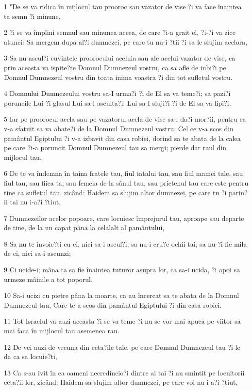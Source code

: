 \par 1 "De se va ridica în mijlocul tau prooroc sau vazator de vise ?i va face înaintea ta semn ?i minune,
\par 2 ?i se va împlini semnul sau minunea aceea, de care ?i-a grait el, ?i-?i va zice atunci: Sa mergem dupa al?i dumnezei, pe care tu nu-i ?tii ?i sa le slujim acelora,
\par 3 Sa nu ascul?i cuvintele proorocului aceluia sau ale acelui vazator de vise, ca prin aceasta va ispite?te Domnul Dumnezeul vostru, ca sa afle de iubi?i pe Domnul Dumnezeul vostru din toata inima voastra ?i din tot sufletul vostru.
\par 4 Domnului Dumnezeului vostru sa-I urma?i ?i de El sa va teme?i; sa pazi?i poruncile Lui ?i glasul Lui sa-l asculta?i; Lui sa-I sluji?i ?i de El sa va lipi?i.
\par 5 Iar pe proorocul acela sau pe vazatorul acela de vise sa-l da?i mor?ii, pentru ca v-a sfatuit sa va abate?i de la Domnul Dumnezeul vostru, Cel ce v-a scos din pamântul Egiptului ?i v-a izbavit din casa robiei, dorind sa te abata de la calea pe care ?i-a poruncit Domnul Dumnezeul tau sa mergi; pierde dar raul din mijlocul tau.
\par 6 De te va îndemna în taina fratele tau, fiul tatalui tau, sau fiul mamei tale, sau fiul tau, sau fiica ta, sau femeia de la sânul tau, sau prietenul tau care este pentru tine ca sufletul tau, zicând: Haidem sa slujim altor dumnezei, pe care tu ?i parin?ii tai nu i-a?i ?tiut,
\par 7 Dumnezeilor acelor popoare, care locuiesc împrejurul tau, aproape sau departe de tine, de la un capat pâna la celalalt al pamântului,
\par 8 Sa nu te învoie?ti cu ei, nici sa-i ascul?i; sa nu-i cru?e ochii tai, sa nu-?i fie mila de ei, nici sa-i ascunzi;
\par 9 Ci ucide-i; mâna ta sa fie înaintea tuturor asupra lor, ca sa-i ucida, ?i apoi sa urmeze mâinile a tot poporul.
\par 10 Sa-i ucizi cu pietre pâna la moarte, ca au încercat sa te abata de la Domnul Dumnezeul tau, Care te-a scos din pamântul Egiptului ?i din casa robiei.
\par 11 Tot Israelul va auzi aceasta ?i se va teme ?i nu se vor mai apuca pe viitor sa mai faca în mijlocul tau asemenea rau.
\par 12 De vei auzi de vreuna din ceta?ile tale, pe care Domnul Dumnezeul tau ?i le da ca sa locuie?ti,
\par 13 Ca s-au ivit în ea oameni necredincio?i dintre ai tai ?i au smintit pe locuitorii ceta?ii lor, zicând: Haidem sa slujim altor dumnezei, pe care voi nu i-a?i ?tiut,

